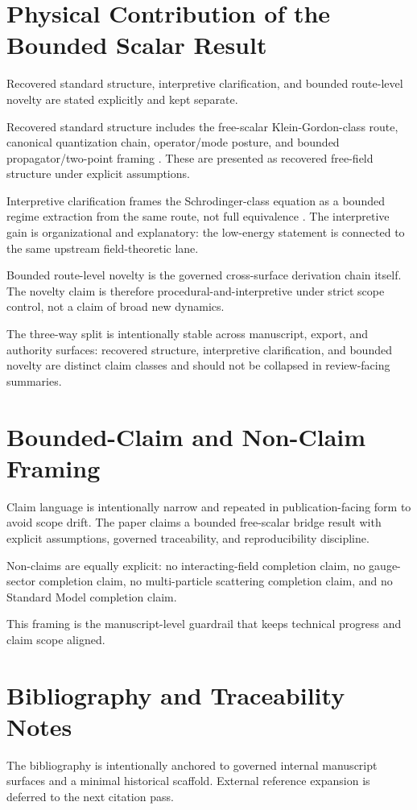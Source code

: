\documentclass[11pt]{article}
\begin{document}
\section{Physical Contribution of the Bounded Scalar Result}
Recovered standard structure, interpretive clarification, and bounded route-level novelty are stated explicitly and kept separate.

Recovered standard structure includes the free-scalar Klein-Gordon-class route, canonical quantization chain, operator/mode posture, and bounded propagator/two-point framing \cite{toescalarroute,klein1926}. These are presented as recovered free-field structure under explicit assumptions.

Interpretive clarification frames the Schrodinger-class equation as a bounded regime extraction from the same route, not full equivalence \cite{schrodinger1926}. The interpretive gain is organizational and explanatory: the low-energy statement is connected to the same upstream field-theoretic lane.

Bounded route-level novelty is the governed cross-surface derivation chain itself. The novelty claim is therefore procedural-and-interpretive under strict scope control, not a claim of broad new dynamics.

The three-way split is intentionally stable across manuscript, export, and authority surfaces: recovered structure, interpretive clarification, and bounded novelty are distinct claim classes and should not be collapsed in review-facing summaries.

\section{Bounded-Claim and Non-Claim Framing}
Claim language is intentionally narrow and repeated in publication-facing form to avoid scope drift. The paper claims a bounded free-scalar bridge result with explicit assumptions, governed traceability, and reproducibility discipline.

Non-claims are equally explicit: no interacting-field completion claim, no gauge-sector completion claim, no multi-particle scattering completion claim, and no Standard Model completion claim.

This framing is the manuscript-level guardrail that keeps technical progress and claim scope aligned.

\section{Bibliography and Traceability Notes}
The bibliography is intentionally anchored to governed internal manuscript surfaces and a minimal historical scaffold. External reference expansion is deferred to the next citation pass.
\end{document}

